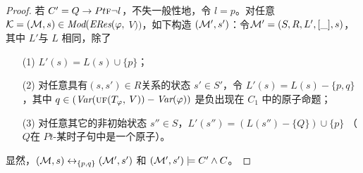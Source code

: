\begin{proof}
	若 $C'= Q\rightarrow Pt \textsc{f} \neg l$，不失一般性地，令 $l=p$。对任意 ${\cal K}=({\cal M}, s)\in \textit{Mod}(\emph{ERes}(\varphi,$ $V))$，如下构造 $({\cal M}',s')$：令${\cal M}'=(S, R, L',[\_], s)$，其中 $L'$与 $L$ 相同，除了
	\begin{itemize}
		\item[(1)] $L'(s) = L(s) \cup \{p\}$；
		\item[(2)] 对任意具有$(s, s')\in R$关系的状态 $s'\in S'$，令 $L'(s) = L(s) - \{p, q\}$，其中 $q \in (\textit{Var}(\textsc{uf}(T_\varphi,$ $V))-\textit{Var}(\varphi))$ 是负出现在 $C_1$ 中的原子命题；
		\item[(3)] 对任意其它的非初始状态 $s'' \in S$，$L'(s'') = (L(s'') - \{Q\}) \cup \{p\}$ （$Q$在 $Pt$-某时子句中是一个原子）。
	\end{itemize}
	显然，$({\cal M}, s) \leftrightarrow_{\{p,q\}} ({\cal M}', s')$ 和 $({\cal M}', s') \models C' \wedge C$。
	

\end{proof}
